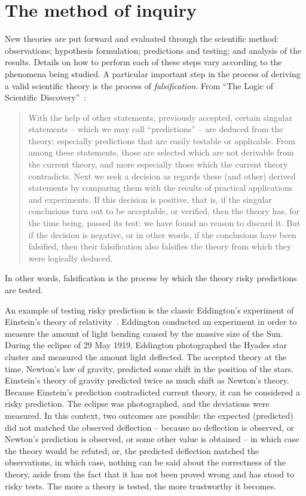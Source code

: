 \section{The method of inquiry}

 New theories are put forward and evaluated through the scientific method: observations; hypothesis formulation; predictions and testing; and analysis of the results. Details on how to perform each of these steps vary according to the phenomena being studied. A particular important step in the process of deriving a valid scientific theory is the process of \emph{falsification}. From ``The Logic of Scientific Discovery''~\cite{popper-scientificdiscovery}:
 \begin{quote}
With the help of other statements, previously accepted, certain singular statements  --  which we may call ``predictions'' -- are deduced from the theory; especially predictions that are easily testable or applicable. From among these statements, those are selected which are not derivable from the current theory, and more especially those which the current theory contradicts. Next we seek a decision as regards these (and other) derived statements by comparing them with the results of practical applications and experiments. If this decision is positive, that is, if the singular conclusions turn out to be acceptable, or verified, then the theory has, for the time being, passed its test: we have found no reason to discard it. But if the decision is negative, or in other words, if the conclusions have been falsified, then their falsification also falsifies the theory from which they were logically deduced.
 \end{quote}
In other words, falsification is the process by which the theory risky predictions are tested.
 
An example of testing risky prediction is the classic Eddington's experiment of Einstein's theory of relativity~\cite{coles2001einstein}. Eddington conducted an experiment in order to measure the amount of light bending caused by the massive size of the Sun.  During the eclipse of 29 May 1919, Eddington photographed the Hyades star cluster and measured the amount light deflected. The accepted theory at the time, Newton's law of gravity, predicted some shift in the position of the stars. Einstein's theory of gravity predicted twice as much shift as Newton's theory. Because Einstein's prediction contradicted current theory, it can be considered a risky prediction.
The eclipse was photographed, and the deviations were measured.  In this context, two outcomes are possible: the expected (predicted) did not matched the observed deflection -- because no deflection is observed, or Newton's prediction is observed, or some other value is obtained --  in which case the theory would be refuted; or, the predicted deflection matched the observations, in which case, nothing can be said about the correctness of the theory, aside from the fact that it has not been proved wrong and has stood to risky tests. The more a theory is tested, the more trustworthy it becomes. 

